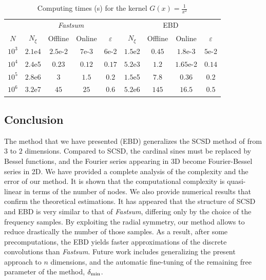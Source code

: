 \documentclass[smallextended]{svjour3}
\begin{document}
   \begin{table}[t]
   	\centering
   	\caption{Computing times (s) for the kernel $G(x) = \frac{1}{x^2}$}
   	\begin{tabular}{*9c}
   		\toprule
   		&  \multicolumn{4}{c}{\textit{Fastsum}} & \multicolumn{4}{c}{EBD}\\
   		\cmidrule(lr){2-5}\cmidrule(lr){6-9}
   		$N$   & $N_\xi$ & Offline   & Online    & $\varepsilon$ & $N_\xi$ & Offline   & Online  & $\varepsilon$ \\
   		$10^3$   &  $2.1$e4 &  $2.5$e-2  & $7$e-3  & $6$e-2 & $1.5$e2 & $ 0.45$ & $1.8$e-3 & $5$e-2 \\
   		$10^4$   & $2.4$e5 & $0.23$ & $0.12$  & $0.17$ 
   		& $5.2$e3 & $1.2$ & $1.65$e-2 & $0.14$\\
   		$10^5$  &  $2.8$e6 & $3$  & $1.5$  & $0.2$ & 
   		$1.5$e5 & $7.8$ & $0.36$ & $0.2$\\
   		$10^6$ & $3.2$e7  & $45$ & $25$  & 0.6& 
   		$5.2$e6  & $145$ & $16.5$ & $0.5$\\
   		\bottomrule
   	\end{tabular}
   \end{table}
\subsection*{Conclusion}
The method that we have presented (EBD) generalizes the SCSD method of \cite{Alouges2015} from $3$ to $2$ dimensions. Compared to SCSD, the cardinal sines must be replaced by Bessel functions, and the Fourier series appearing in 3D become Fourier-Bessel series in 2D. We have provided a complete analysis of the complexity and the error of our method. It is shown that the computational complexity is quasi-linear in terms of the number of nodes. We also provide numerical results that confirm the theoretical estimations. It has appeared that the structure of SCSD and EBD is very similar to that of \textit{Fastsum}, differing only by the choice of the frequency samples. By exploiting the radial symmetry, our method allows to reduce drastically the number of those samples. As a result, after some precomputations, the EBD yields faster approximations of the discrete convolutions than \textit{Fastsum}. Future work includes generalizing the present approach to $n$ dimensions, and the automatic fine-tuning of the remaining free parameter of the method, $\delta_{\min}$.


	
	
										
\end{document}
